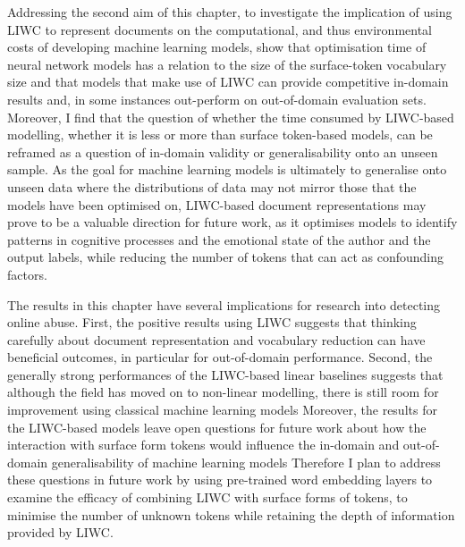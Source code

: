 Addressing the second aim of this chapter, to investigate the implication of using LIWC to represent documents on the computational, and thus environmental costs of developing machine learning models, show that optimisation time of neural network models has a relation to the size of the surface-token vocabulary size and that models that make use of LIWC can provide competitive in-domain results and, in some instances out-perform on out-of-domain evaluation sets. 
Moreover, I find that the question of whether the time consumed by LIWC-based modelling, whether it is less or more than surface token-based models, can be reframed as a question of in-domain validity or generalisability onto an unseen sample. 
As the goal for machine learning models is ultimately to generalise onto unseen data where the distributions of data may not mirror those that the models have been optimised on, LIWC-based document representations may prove to be a valuable direction for future work, as it optimises models to identify patterns in cognitive processes and the emotional state of the author and the output labels, while reducing the number of tokens that can act as confounding factors.

The results in this chapter have several implications for research into detecting online abuse.
First, the positive results using LIWC suggests that thinking carefully about document representation and vocabulary reduction can have beneficial outcomes, in particular for out-of-domain performance.
Second, the generally strong performances of the LIWC-based linear baselines suggests that although the field has moved on to non-linear modelling, there is still room for improvement using classical machine learning models
Moreover, the results for the LIWC-based models leave open questions for future work about how the interaction with surface form tokens would influence the in-domain and out-of-domain generalisability of machine learning models
Therefore I plan to address these questions in future work by using pre-trained word embedding layers to examine the efficacy of combining LIWC with surface forms of tokens, to minimise the number of unknown tokens while retaining the depth of information provided by LIWC.

